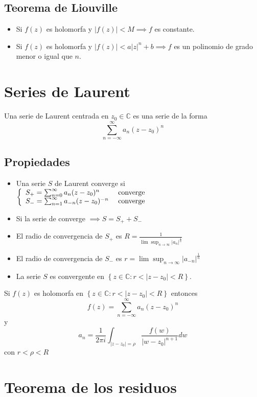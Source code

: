 \documentclass[paper=a4, fontsize=11pt]{scrartcl}
\numberwithin{equation}{section}
\numberwithin{figure}{section}
\numberwithin{table}{section}
\begin{document}
\subsection{Teorema de Liouville}
\begin{itemize}
\item Si $f(z)$ es holomorfa y $|f(z)|<M \implies f$ es constante.
\item Si $f(z)$ es holomorfa y $|f(z)|<a|z|^n + b \implies f$ es un polinomio de grado menor o igual que $n$.
\end{itemize}

\newpage
\section{Series de Laurent}
Una serie de Laurent centrada en $z_0\in\mathbb{C}$ es una serie de la forma
$$\sum_{n=-\infty}^\infty a_n(z-z_0)^n$$

\subsection{Propiedades}
\begin{itemize}
\item Una serie $S$ de Laurent converge si
$\left\{\begin{array}{l l}
S_{+}=\sum_{n=0}^\infty a_n(z-z_0)^n & \text{ converge}\\
S_{-}=\sum_{n=1}^\infty a_{-n}(z-z_0)^{-n} &  \text{ converge}
\end{array}\right.$
\item Si la serie de converge $\implies S=S_++S_-$
\item El radio de convergencia de $S_+$ es $R = \frac{1}{\lim\sup_{n\to\infty} {|a_n|^{\frac{1}{n}}}}$
\item El radio de convergencia de $S_-$ es $r={\lim\sup_{n\to\infty} {|a_{-n}|^\frac{1}{n}}}$
\item La serie $S$ es convergente en $\left\{z\in\mathbb{C}: r<\left|z-z_0\right|<R\right\}$.
\end{itemize}

Si $f(z)$ es holomorfa en $\left\{z\in\mathbb{C}: r<\left|z-z_0\right|<R\right\}$
entonces
$$f(z) = \sum_{n=-\infty}^\infty a_n(z-z_0)^n$$
y
$$a_n = \frac{1}{2\pi i}\int_{|z-z_0|=\rho} \frac{f(w)}{|w-z_0|^{n+1}}dw$$
con $r<\rho<R$



\newpage
\section{Teorema de los residuos}
\end{document}
